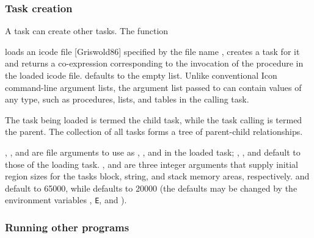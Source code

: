 \subsubsection{Task creation}

A task can create other tasks. The function 


\noindent loads an icode file [Griswold86] specified by the file name
, creates a task for it and returns a
co-expression corresponding to the invocation of the procedure
 in the loaded icode file.
\textstyleSourceText{ }defaults to the
empty list. Unlike conventional Icon command-line argument lists, the
argument list passed to\textstyleSourceText{
} can contain values of any type,
such as procedures, lists, and tables in the calling task.

The task being loaded is termed the child task, while the task calling
 is termed the parent. The
collection of all tasks forms a tree of parent-child
relationships.

, ,
and \textstyleSourceText{ }are file
arguments to use as ,
, and
 in the loaded task;
,
, and
\textstyleSourceText{\textrm{
}}default to those of the loading task.\textstyleSourceText{\textrm{
}} ,
and  are three integer arguments that
supply initial region sizes for the task{\textquotesingle}s block,
string, and stack memory areas, respectively.
 and 
default to 65000, while defaults to
20000 (the defaults may be changed by the environment variables
,
\texttt{E}, and
). 

\subsubsection{Running other programs}

